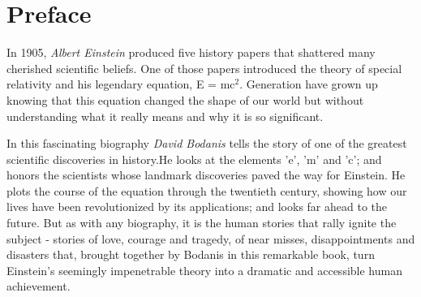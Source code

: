 %

\chapter{Preface}

In 1905, \emph{Albert Einstein} produced five history papers that shattered many cherished scientific beliefs. One of those papers introduced the theory of special relativity and his legendary equation, E = mc$^2$. Generation have grown up knowing that this equation changed the shape of our world but without understanding what it really means and why it is so significant.

In this fascinating biography \emph{David Bodanis} tells the story of one of the greatest scientific discoveries in history.He looks at the elements 'e', 'm' and 'c'; and honors the scientists whose landmark discoveries paved the way for Einstein. He plots the course of the equation through the twentieth century, showing how our lives have been revolutionized by its applications; and looks far ahead to the future. But as with any biography, it is the human stories that rally ignite the subject - stories of love, courage and tragedy, of near misses, disappointments and disasters that, brought together by Bodanis in this remarkable book, turn Einstein's seemingly impenetrable theory into a dramatic and accessible human achievement.